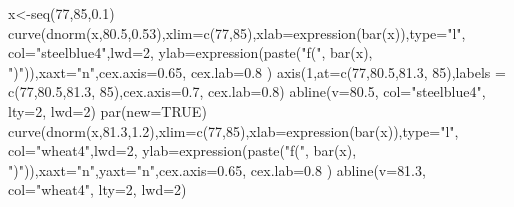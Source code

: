\documentclass[
  letterpaper,
  DIV=11,
  numbers=noendperiod]{scrartcl}
\newenvironment{Shaded}{\begin{snugshade}}{\end{snugshade}}
\newcommand{\AttributeTok}[1]{\textcolor[rgb]{0.40,0.45,0.13}{#1}}
\newcommand{\ConstantTok}[1]{\textcolor[rgb]{0.56,0.35,0.01}{#1}}
\newcommand{\DecValTok}[1]{\textcolor[rgb]{0.68,0.00,0.00}{#1}}
\newcommand{\FloatTok}[1]{\textcolor[rgb]{0.68,0.00,0.00}{#1}}
\newcommand{\FunctionTok}[1]{\textcolor[rgb]{0.28,0.35,0.67}{#1}}
\newcommand{\NormalTok}[1]{\textcolor[rgb]{0.00,0.23,0.31}{#1}}
\newcommand{\OtherTok}[1]{\textcolor[rgb]{0.00,0.23,0.31}{#1}}
\newcommand{\StringTok}[1]{\textcolor[rgb]{0.13,0.47,0.30}{#1}}
\begin{document}
\begin{Shaded}
\begin{Highlighting}[]
\NormalTok{x}\OtherTok{\textless{}{-}}\FunctionTok{seq}\NormalTok{(}\DecValTok{77}\NormalTok{,}\DecValTok{85}\NormalTok{,}\FloatTok{0.1}\NormalTok{) }
\FunctionTok{curve}\NormalTok{(}\FunctionTok{dnorm}\NormalTok{(x,}\FloatTok{80.5}\NormalTok{,}\FloatTok{0.53}\NormalTok{),}\AttributeTok{xlim=}\FunctionTok{c}\NormalTok{(}\DecValTok{77}\NormalTok{,}\DecValTok{85}\NormalTok{),}\AttributeTok{xlab=}\FunctionTok{expression}\NormalTok{(}\FunctionTok{bar}\NormalTok{(x)),}\AttributeTok{type=}\StringTok{"l"}\NormalTok{,}
      \AttributeTok{col=}\StringTok{"steelblue4"}\NormalTok{,}\AttributeTok{lwd=}\DecValTok{2}\NormalTok{, }\AttributeTok{ylab=}\FunctionTok{expression}\NormalTok{(}\FunctionTok{paste}\NormalTok{(}\StringTok{"f("}\NormalTok{, }\FunctionTok{bar}\NormalTok{(x),}
      \StringTok{")"}\NormalTok{)),}\AttributeTok{xaxt=}\StringTok{"n"}\NormalTok{,}\AttributeTok{cex.axis=}\FloatTok{0.65}\NormalTok{, }\AttributeTok{cex.lab=}\FloatTok{0.8}\NormalTok{ ) }
\FunctionTok{axis}\NormalTok{(}\DecValTok{1}\NormalTok{,}\AttributeTok{at=}\FunctionTok{c}\NormalTok{(}\DecValTok{77}\NormalTok{,}\FloatTok{80.5}\NormalTok{,}\FloatTok{81.3}\NormalTok{, }\DecValTok{85}\NormalTok{),}\AttributeTok{labels =}
       \FunctionTok{c}\NormalTok{(}\DecValTok{77}\NormalTok{,}\FloatTok{80.5}\NormalTok{,}\FloatTok{81.3}\NormalTok{, }\DecValTok{85}\NormalTok{),}\AttributeTok{cex.axis=}\FloatTok{0.7}\NormalTok{, }\AttributeTok{cex.lab=}\FloatTok{0.8}\NormalTok{) }
\FunctionTok{abline}\NormalTok{(}\AttributeTok{v=}\FloatTok{80.5}\NormalTok{, }\AttributeTok{col=}\StringTok{"steelblue4"}\NormalTok{, }\AttributeTok{lty=}\DecValTok{2}\NormalTok{, }\AttributeTok{lwd=}\DecValTok{2}\NormalTok{)}
\FunctionTok{par}\NormalTok{(}\AttributeTok{new=}\ConstantTok{TRUE}\NormalTok{)}
\FunctionTok{curve}\NormalTok{(}\FunctionTok{dnorm}\NormalTok{(x,}\FloatTok{81.3}\NormalTok{,}\FloatTok{1.2}\NormalTok{),}\AttributeTok{xlim=}\FunctionTok{c}\NormalTok{(}\DecValTok{77}\NormalTok{,}\DecValTok{85}\NormalTok{),}\AttributeTok{xlab=}\FunctionTok{expression}\NormalTok{(}\FunctionTok{bar}\NormalTok{(x)),}\AttributeTok{type=}\StringTok{"l"}\NormalTok{,}
      \AttributeTok{col=}\StringTok{"wheat4"}\NormalTok{,}\AttributeTok{lwd=}\DecValTok{2}\NormalTok{, }\AttributeTok{ylab=}\FunctionTok{expression}\NormalTok{(}\FunctionTok{paste}\NormalTok{(}\StringTok{"f("}\NormalTok{, }\FunctionTok{bar}\NormalTok{(x),}
      \StringTok{")"}\NormalTok{)),}\AttributeTok{xaxt=}\StringTok{"n"}\NormalTok{,}\AttributeTok{yaxt=}\StringTok{"n"}\NormalTok{,}\AttributeTok{cex.axis=}\FloatTok{0.65}\NormalTok{, }\AttributeTok{cex.lab=}\FloatTok{0.8}\NormalTok{ ) }
\FunctionTok{abline}\NormalTok{(}\AttributeTok{v=}\FloatTok{81.3}\NormalTok{, }\AttributeTok{col=}\StringTok{"wheat4"}\NormalTok{, }\AttributeTok{lty=}\DecValTok{2}\NormalTok{, }\AttributeTok{lwd=}\DecValTok{2}\NormalTok{)}
\end{Highlighting}
\end{Shaded}
\end{document}
